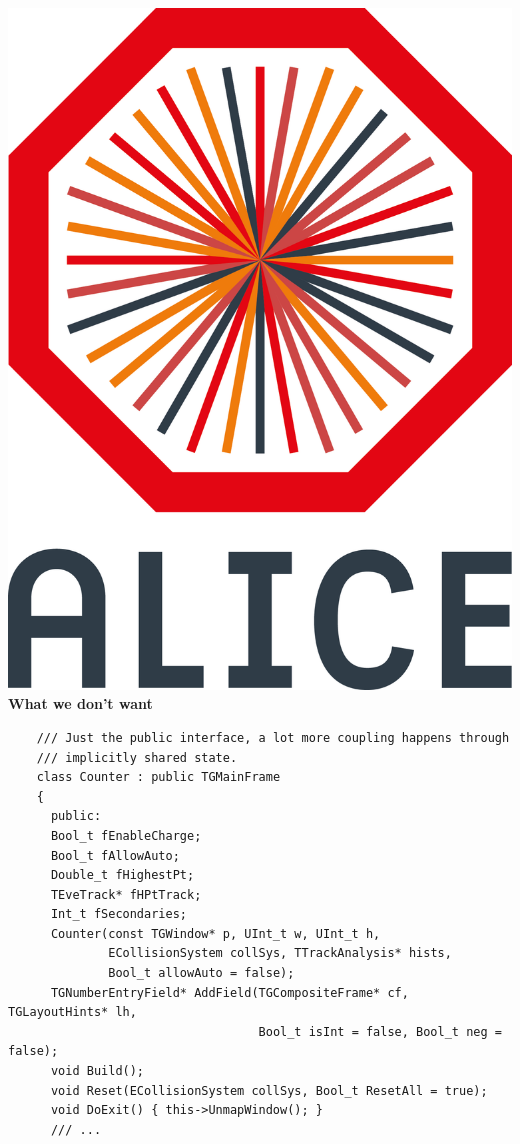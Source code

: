 \documentclass[aspectratio=1610,14pt,dvipsnames]{beamer}
\begin{document}
\begin{frame}[fragile]{\includegraphics[height=0.07\textheight]{2012-Jul-04-4_Color_Logo_CB.png} \hspace{0.2cm}\textbf{What we don't want}}
  \begin{verbatim}
    /// Just the public interface, a lot more coupling happens through 
    /// implicitly shared state.
    class Counter : public TGMainFrame
    {
      public:
      Bool_t fEnableCharge;
      Bool_t fAllowAuto;
      Double_t fHighestPt;
      TEveTrack* fHPtTrack;
      Int_t fSecondaries;
      Counter(const TGWindow* p, UInt_t w, UInt_t h,
              ECollisionSystem collSys, TTrackAnalysis* hists,
              Bool_t allowAuto = false);
      TGNumberEntryField* AddField(TGCompositeFrame* cf, TGLayoutHints* lh,
                                   Bool_t isInt = false, Bool_t neg = false);
      void Build();
      void Reset(ECollisionSystem collSys, Bool_t ResetAll = true);
      void DoExit() { this->UnmapWindow(); }
      /// ...
  \end{verbatim}
\end{frame}
\end{document}
